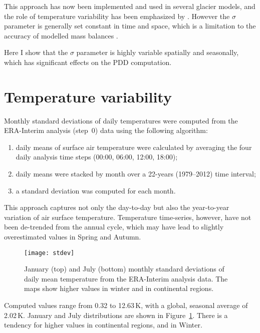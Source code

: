 \documentclass[twocolumn]{igs}
\begin{document}
This approach has now been implemented and used in several glacier models, and the role of temperature variability has been emphasized by \citet{charbit-etal-2012}. However the $\sigma$ parameter is generally set constant in time and space, which is a limitation to the accuracy of modelled mass balances \citep{charbit-etal-2012}.

Here I show that the $\sigma$ parameter is highly variable spatially and seasonally, which has significant effects on the PDD computation.


\section{Temperature variability}

Monthly standard deviations of daily temperatures were computed from the ERA-Interim \citep{data:erai} analysis (step~0) data using the following algorithm:

\begin{enumerate}
  \item daily means of surface air temperature were calculated by averaging the four daily analysis time steps (00:00, 06:00, 12:00, 18:00);
  \item daily means were stacked by month over a 22-years (1979--2012) time interval;
  \item a standard deviation was computed for each month.
\end{enumerate}

This approach captures not only the day-to-day but also the year-to-year variation of air surface temperature. Temperature time-series, however, have not been de-trended from the annual cycle, which may have lead to slightly overestimated values in Spring and Autumn.

\begin{figure}
  \centering\texttt{[image: stdev]}
  \caption{January (top) and July (bottom) monthly standard deviations of daily mean temperature from the ERA-Interim analysis data. The maps show higher values in winter and in continental regions.}
  \label{fig:stdev}
\end{figure}

Computed values range from 0.32 to 12.63\,K, with a global, seasonal average of 2.02\,K. January and July distributions are shown in Figure~\ref{fig:stdev}. There is a tendency for higher values in continental regions, and in Winter.
\end{document}
